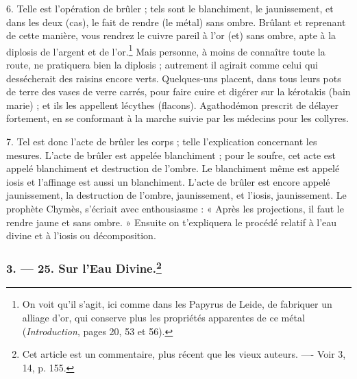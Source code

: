 \documentclass[landscape, a4paper, 11pt, oneside, polutonikogreek, french]{article}
\begin{document}
6. Telle est l'opération de brûler ; tels sont le blanchiment, le jaunissement, et dans les deux (cas), le fait de rendre (le métal) sans ombre. Brûlant et reprenant de cette manière, vous rendrez le cuivre pareil à l'or (et) sans ombre, apte à la diplosis de l'argent et de l'or.\footnote{On voit qu'il s'agit, ici comme dans les Papyrus de Leide, de fabriquer un alliage d'or, qui conserve plus les propriétés apparentes de ce métal (\emph{Introduction}, pages 20, 53 et 56).} Mais personne, à moins de connaître toute la route, ne pratiquera bien la diplosis ; autrement il agirait comme celui qui dessécherait des raisins encore verts. Quelques-uns placent, dans tous leurs pots de terre des vases de verre carrés, pour faire cuire et digérer sur la kérotakis (bain marie) ; et ils les appellent lécythes (flacons). Agathodémon prescrit de délayer fortement, en se conformant à la marche suivie par les médecins pour les collyres.

7. Tel est donc l'acte de brûler les corps ; telle l'explication concernant les mesures. L'acte de brûler est appelée blanchiment ; pour le soufre, cet acte est appelé blanchiment et destruction de l'ombre. Le blanchiment même est appelé iosis et l'affinage est aussi un blanchiment. L'acte de brûler est encore appelé jaunissement, la destruction de l'ombre, jaunissement, et l'iosis, jaunissement. Le prophète Chymès, s'écriait avec enthousiasme : « Après les projections, il faut le rendre jaune et sans ombre. » Ensuite on t'expliquera le procédé relatif à l'eau divine et à l'iosis ou décomposition.

\bigskip
\centerline{\EightStarTaper}
\centerline{\EightStarTaper\EightStarTaper}
\bigskip

\subsubsection[3. --- 25. Sur l'Eau Divine.]{3. --- 25. Sur l'Eau Divine.\footnote{Cet article est un commentaire, plus récent que les vieux auteurs. ---- Voir 3, 14, p. 155.}}
\end{document}
